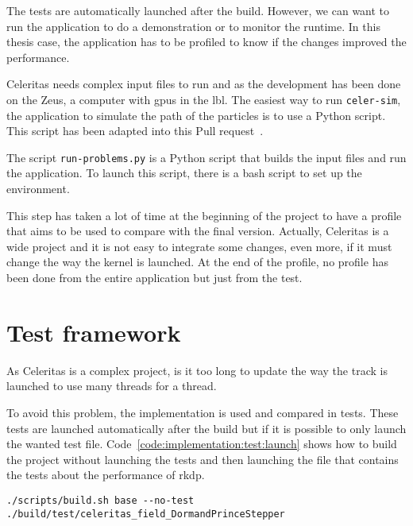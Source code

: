 The tests are automatically launched after the build.
However, we can want to run the application to do a demonstration or to
monitor the runtime.
In this thesis case, the application has to be profiled to know if the changes
improved the performance.

Celeritas needs complex input files to run and as the development has been done
on the Zeus, a computer with \acrshort{gpu}s in the \acrshort{lbl}.
The easiest way to run \texttt{celer-sim}, the application to simulate the
path of the particles is to use a Python script.
This script has been adapted into this Pull request~\cite{regression-pull-request}.

The script \texttt{run-problems.py} is a Python script that builds the input
files and run the application.
To launch this script, there is a bash script to set up the environment.

This step has taken a lot of time at the beginning of the project to have a
profile that aims to be used to compare with the final version.
Actually, Celeritas is a wide project and it is not easy to integrate some
changes, even more, if it must change the way the kernel is launched.
At the end of the profile, no profile has been done from the entire application
but just from the test.

\section{Test framework}
\label{ch:implementation:test}

As Celeritas is a complex project, is it too long to update the way the track is
launched to use many threads for a thread.

To avoid this problem, the implementation is used and compared in tests.
These tests are launched automatically after the build but if it is possible to
only launch the wanted test file.
Code~\ref{code:implementation:test:launch} shows how to build the project
without launching the tests and then launching the file that contains the tests
about the performance of \acrshort{rkdp}.

\begin{code}
    \label{code:implementation:test:launch}
    \begin{verbatim}
./scripts/build.sh base --no-test
./build/test/celeritas_field_DormandPrinceStepper
    \end{verbatim}
\end{code}

